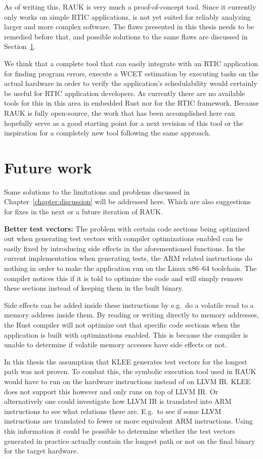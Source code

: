 As of writing this, RAUK is very much a proof-of-concept tool. Since it
currently only works on simple RTIC applications, is not yet suited for
reliably analyzing larger and more complex software. The flaws presented in
this thesis needs to be remedied before that, and possible solutions to the
same flaws are discussed in Section~\ref{chapter:futurework}.

We think that a complete tool that can easily integrate with an RTIC
application for finding program errors, execute a WCET estimation by executing
tasks on the actual hardware in order to verify the application's
schedulability would certainly be useful for RTIC application developers. As
currently there are no available tools for this in this area in embedded Rust
nor for the RTIC framework. Because RAUK is fully open-source, the work that
has been accomplished here can hopefully serve as a good starting point for a
next revision of this tool or the inspiration for a completely new tool
following the same approach.

\section{Future work}
\label{chapter:futurework}
Some solutions to the limitations and problems discussed in
Chapter~\ref{chapter:discussion} will be addressed here. Which are also
suggestions for fixes in the next or a future iteration of RAUK\@.

\textbf{Better test vectors:} The problem with certain code sections being
optimized out when generating test vectors with compiler optimizations enabled
can be easily fixed by introducing side effects in the aforementioned
functions. In the current implementation when generating tests, the ARM related
instructions do nothing in order to make the application run on the Linux
x86--64 toolchain. The compiler notices this if it is told to optimize the code
and will simply remove these sections instead of keeping them in the built
binary.

Side effects can be added inside these instructions by e.g.\ do a volatile
read to a memory address inside them. By reading or writing directly to memory
addresses, the Rust compiler will not optimize out that specific code sections
when the application is built with optimizations enabled. This is because the
compiler is unable to determine if volatile memory accesses have side effects
or not.

In this thesis the assumption that KLEE generates test vectors for the longest
path was not proven. To combat this, the symbolic execution tool used in RAUK
would have to run on the hardware instructions instead of on LLVM IR\@. KLEE does
not support this however and only runs on top of LLVM IR\@. Or alternatively one
could investigate how LLVM IR is translated into ARM instructions to see what
relations there are. E.g.\ to see if some LLVM instructions are translated to
fewer or more equivalent ARM instructions. Using this information it could
be possible to determine whether the test vectors generated in practice
actually contain the longest path or not on the final binary for the target
hardware.

